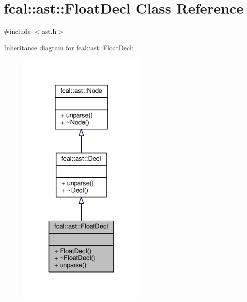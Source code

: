 \hypertarget{classfcal_1_1ast_1_1FloatDecl}{}\section{fcal\+:\+:ast\+:\+:Float\+Decl Class Reference}
\label{classfcal_1_1ast_1_1FloatDecl}


{\ttfamily \#include $<$ast.\+h$>$}



Inheritance diagram for fcal\+:\+:ast\+:\+:Float\+Decl\+:
\nopagebreak
\begin{figure}[H]
\begin{center}
\leavevmode
\includegraphics[width=180pt]{classfcal_1_1ast_1_1FloatDecl__inherit__graph}
\end{center}
\end{figure}


